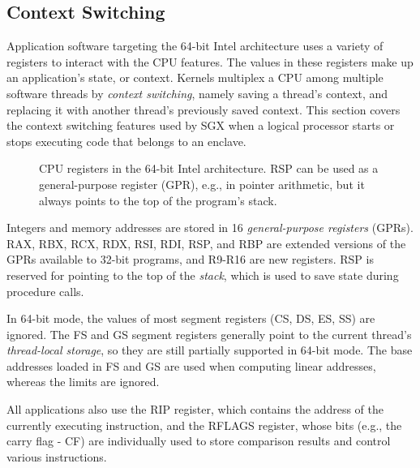 \subsection{Context Switching}
\label{sec:registers}

Application software targeting the 64-bit Intel architecture uses a variety of
registers to interact with the CPU features. The values in these registers
make up an application's state, or context. Kernels multiplex a CPU among
multiple software threads by \textit{context switching}, namely saving a
thread's context, and replacing it with another thread's previously saved
context. This section covers the context switching features used by SGX when a
logical processor starts or stops executing code that belongs to an enclave.

\begin{figure}[hbt]
  \caption{
    CPU registers in the 64-bit Intel architecture. RSP can be used as a
    general-purpose register (GPR), e.g., in pointer arithmetic, but it always
    points to the top of the program's stack.
  }
  \label{fig:cpu_registers}
\end{figure}

Integers and memory addresses are stored in 16 \textit{general-purpose
registers} (GPRs). RAX, RBX, RCX, RDX, RSI, RDI, RSP, and RBP are extended
versions of the GPRs available to 32-bit programs, and R9-R16 are new
registers. RSP is reserved for pointing to the top of the \textit{stack}, which
is used to save state during procedure calls.

In 64-bit mode, the values of most segment registers (CS, DS, ES, SS) are
ignored. The FS and GS segment registers generally point to the current
thread's \textit{thread-local storage}, so they are still partially supported
in 64-bit mode. The base addresses loaded in FS and GS are used when computing
linear addresses, whereas the limits are ignored.

All applications also use the RIP register, which contains the address of the
currently executing instruction, and the RFLAGS register, whose bits (e.g.,
the carry flag - CF) are individually used to store comparison results and
control various instructions.

